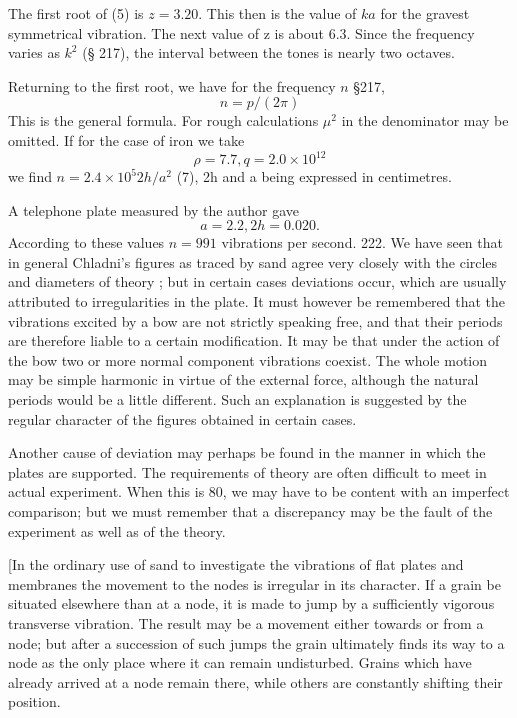 
The first root of (5) is \(z=3.20\). This then is the value of \(ka\) for the
gravest symmetrical vibration. The next value of z is about 6.3. Since
the frequency varies as \(k^2\) (§ 217), the interval
between the tones is nearly two octaves.

Returning to the first root, we have for the frequency \(n\) §217,
\[ n = p/(2 \pi) \]
This is the general formula. For rough calculations \(\mu^2\) in the
denominator may be omitted. If for the case of iron we take
\[ \rho = 7.7, q = 2.0 \times 10^{12}\]
we find \(n  = 2.4 \times 10^{5}  2h/a^2\) (7),
2h and a being expressed in centimetres.

A telephone plate measured by the author gave
\[ a = 2.2, 2h = 0.020.\]
According to these values \(n = 991\) vibrations per second.
222. We have seen that in general Chladni's figures as traced by sand
agree very closely with the circles and diameters of theory ; but in
certain cases deviations occur, which are usually attributed to
irregularities in the plate. It must however be remembered that the
vibrations excited by a bow are not strictly speaking free, and that
their periods are therefore liable to a certain modification. It may be
that under the action of the bow two or more normal component vibrations
coexist. The whole motion may be simple harmonic in virtue of the
external force, although the natural periods would be a little
different. Such an explanation is suggested by the regular character of
the figures obtained in certain cases.

Another cause of deviation may perhaps be found in the manner in which
the plates are supported. The requirements of theory are often difficult
to meet in actual experiment. When this is 80, we may have to be content
with an imperfect comparison; but we must remember that a discrepancy
may be the fault of the experiment as well as of the theory.

[In the ordinary use of sand to investigate the vibrations of
flat plates and membranes the movement to the nodes is irregular
in its character. If a grain be situated elsewhere than at a node,
it is made to jump by a sufficiently vigorous transverse vibration.
The result may be a movement either towards or from a node;
but after a succession of such jumps the grain ultimately finds its
way to a node as the only place where it can remain undisturbed.
Grains which have already arrived at a node remain there, while others are
constantly shifting their position.

